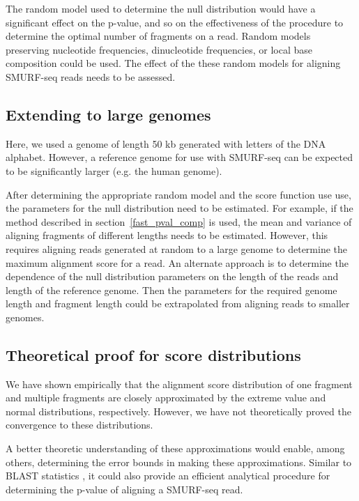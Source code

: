The random model used to determine the null distribution would have a
significant effect on the p-value, and so on the effectiveness of the
procedure to determine the optimal number of fragments on a read. Random
models preserving nucleotide frequencies, dinucleotide frequencies, or
local base composition could be used.  The effect of the these random
models for aligning SMURF-seq reads needs to be assessed.

\subsection*{Extending to large genomes}
Here, we used a genome of length 50 kb generated with letters of the DNA
alphabet. However, a reference genome for use with SMURF-seq can be
expected to be significantly larger (e.g. the human genome).

After determining the appropriate random model and the score function
use use, the parameters for the null distribution need to be estimated.
For example, if the method described in section~\ref{fast_pval_comp} is
used, the mean and variance of aligning fragments of different lengths
needs to be estimated.
%
However, this requires aligning reads generated at random to a large
genome to determine the maximum alignment score for a read.
%
An alternate approach is to determine the dependence of the null
distribution parameters on the length of the reads and length of the
reference genome. Then the parameters for the required genome length and
fragment length could be extrapolated from aligning reads to smaller
genomes.

\subsection*{Theoretical proof for score distributions}
We have shown empirically that the alignment score distribution of one
fragment and multiple fragments are closely approximated by the extreme
value and normal distributions, respectively. However, we have not
theoretically proved the convergence to these distributions.

A better theoretic understanding of these approximations would enable,
among others, determining the error bounds in making these
approximations.
%
Similar to BLAST statistics
\citep{karlin1990methods,karlin1990statistical}, it could also provide
an efficient analytical procedure for determining the p-value of
aligning a SMURF-seq read.

